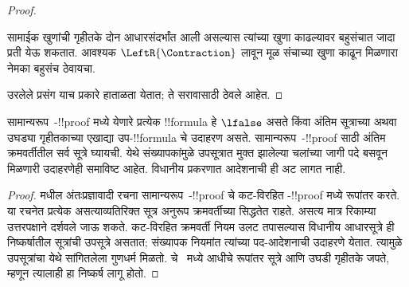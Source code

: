 \documentclass[../../../include/open-logic-section]{subfiles}
\begin{document}
\begin{proof}
\begin{enumerate}
सामाईक खुणांची गृहीतके दोन आधारसंदर्भांत आली असल्यास
त्यांच्या खुणा काढल्यावर बहुसंचात जादा प्रती येऊ शकतात.
आवश्यक $\LeftR{\Contraction}$ लावून मूळ संचाच्या
खुणा काढून मिळणारा नेमका बहुसंच ठेवायचा.
\end{enumerate}
उरलेले प्रसंग याच प्रकारे हाताळता येतात;
ते सरावासाठी ठेवले आहेत.
\end{proof}

\begin{cor}
सामान्यरूप~-!!{proof} मध्ये येणारे प्रत्येक
!!{formula} हे $\lfalse$ असते किंवा अंतिम सूत्राच्या
अथवा उघड्या गृहीतकाच्या एखाद्या उप-!!{formula} चे
उदाहरण असते. सामान्यरूप~-!!{proof} साठी
अंतिम क्रमवर्तीतील सर्व सूत्रे घ्यायची.
येथे संख्यापकांमुळे उपसूत्रात मुक्त झालेल्या चलांच्या
जागी पदे बसवून मिळणारी उदाहरणेही समाविष्ट आहेत.
विधानीय प्रकरणात आदेशनाची ही अट लागत नाही.
\end{cor}

\begin{proof}
   मधील अंतःप्रज्ञावादी
  रचना सामान्यरूप~-!!{proof} चे कट-विरहित
  -!!{proof} मध्ये रूपांतर करते.
  या रचनेत प्रत्येक असत्याव्यतिरिक्त सूत्र अनुरूप
  क्रमवर्तीच्या सिद्धतेत राहते. असत्य मात्र रिकाम्या
  उत्तरपक्षाने दर्शवले जाऊ शकते.
  कट-विरहित क्रमवर्ती नियम उलट तपासल्यास विधानीय
  आधारसूत्रे ही निष्कर्षातील सूत्रांची उपसूत्रे असतात;
  संख्यापक नियमांत त्यांच्या पद-आदेशनाची उदाहरणे येतात.
  त्यामुळे उपसूत्रांचा येथे सांगितलेला गुणधर्म मिळतो.
   चे~ मध्ये आधीचे रूपांतर सूत्रे
  आणि उघडी गृहीतके जपते, म्हणून त्यालाही हा निष्कर्ष लागू होतो.
\end{proof}
\end{document}
